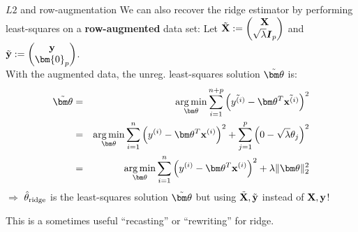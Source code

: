 \documentclass[11pt,compress,t,notes=noshow, xcolor=table]{beamer}
\begin{document}
\begin{vbframe}{$L2$ and row-augmentation}
We can also recover the ridge estimator by performing least-squares on a \textbf{row-augmented} data set: Let $\tilde{\mathbf{X}}:= \begin{pmatrix} \mathbf{X} \\ \sqrt{\lambda} \boldsymbol{I}_{p} \end{pmatrix}$ and $\tilde{\yv} := \begin{pmatrix}
    \yv \\ \bm{0}_{p}
\end{pmatrix}$. \\
With the augmented data, the unreg. least-squares solution $\tilde{\thetav}$ is:
{\small
\begin{eqnarray*}
\tilde{\thetav} &=& \argmin_{\thetav} 
\sum_{i=1}^{n+p} \left(\tilde{\yi} - \thetav^T \tilde{\xi} \right)^2 \\ &=& \argmin_{\thetav} 
\sum_{i=1}^{n} \left(\yi - \thetav^T \xi \right)^2 + \sum_{j=1}^{p} \left(0 - \sqrt{\lambda} \theta_j \right)^2 \\ %
&=& \argmin_{\thetav} \sumin \left(\yi - \thetav^T \xi \right)^2 + \lambda \|\thetav\|_2^2
\end{eqnarray*}
}
$\Longrightarrow$ $\hat{\theta}_{\text{ridge}}$ is the least-squares solution $\tilde{\thetav}$ but using $\tilde{\mathbf{X}},\tilde{\mathbf{y}}$ instead of $\mathbf{X}, \mathbf{y}$!\\

\lz

This is a sometimes useful ``recasting'' or ``rewriting'' for ridge.
\end{vbframe}
\end{document}
